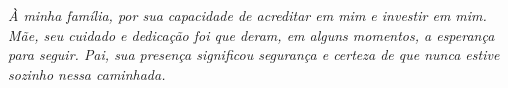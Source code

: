%
%

\thispagestyle{empty}

\begin{dedicatoria}	
\textit{À minha família, por sua capacidade de acreditar em mim e investir em mim. Mãe, seu cuidado e dedicação foi que deram, em alguns momentos, a esperança para seguir. Pai, sua presença significou segurança e certeza de que nunca estive sozinho nessa caminhada.}
\end{dedicatoria}